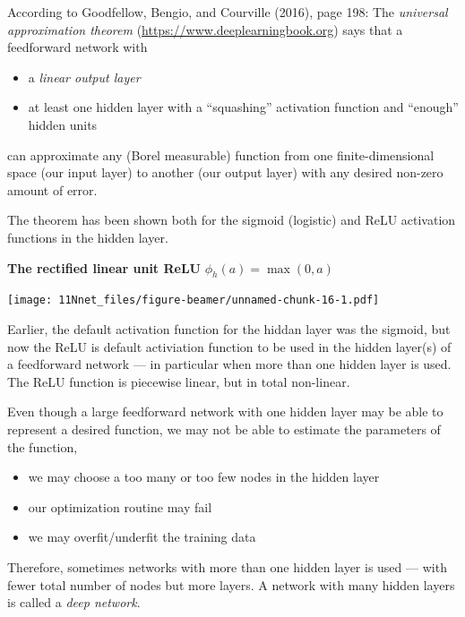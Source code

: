 \documentclass[10pt,ignorenonframetext,]{beamer}
\providecommand{\tightlist}{%
  \setlength{\itemsep}{0pt}\setlength{\parskip}{0pt}}
\begin{document}
\begin{frame}

According to Goodfellow, Bengio, and Courville (2016), page 198: The
\emph{universal approximation theorem}
(\url{https://www.deeplearningbook.org}) says that a feedforward network
with

\begin{itemize}
\tightlist
\item
  a \emph{linear output layer}
\item
  at least one hidden layer with a ``squashing'' activation function and
  ``enough'' hidden units
\end{itemize}

can approximate any (Borel measurable) function from one
finite-dimensional space (our input layer) to another (our output layer)
with any desired non-zero amount of error.

The theorem has been shown both for the sigmoid (logistic) and ReLU
activation functions in the hidden layer.

\end{frame}

\begin{frame}

\textbf{The rectified linear unit ReLU} \(\phi_h(a)=\max(0,a)\)

\texttt{[image: 11Nnet\_files/figure-beamer/unnamed-chunk-16-1.pdf]}

\end{frame}

\begin{frame}

Earlier, the default activation function for the hiddan layer was the
sigmoid, but now the ReLU is default activiation function to be used in
the hidden layer(s) of a feedforward network --- in particular when more
than one hidden layer is used. The ReLU function is piecewise linear,
but in total non-linear.

\end{frame}

\begin{frame}

Even though a large feedforward network with one hidden layer may be
able to represent a desired function, we may not be able to estimate the
parameters of the function,

\begin{itemize}
\tightlist
\item
  we may choose a too many or too few nodes in the hidden layer
\item
  our optimization routine may fail
\item
  we may overfit/underfit the training data
\end{itemize}

Therefore, sometimes networks with more than one hidden layer is used
--- with fewer total number of nodes but more layers. A network with
many hidden layers is called a \emph{deep network}.

\end{frame}
\end{document}
